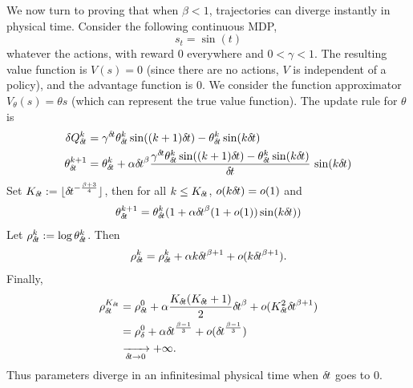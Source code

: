 We now turn to proving that when $\beta < 1$,
trajectories can diverge instantly in physical time. 
Consider the following continuous MDP, 
\begin{equation}
	s_t = \sin(t)
\end{equation}
whatever the actions,
with reward $0$ everywhere and $0 < \gamma < 1$.
The resulting value function is $V(s) = 0$ (since there
are no actions, $V$ is independent of a policy), and the advantage
function is $0$.
We consider the function approximator $V_\theta(s) = \theta s$ (which can
represent the true value function).
The update rule for $\theta$ is
\begin{align}
\delta Q_{\delta\hspace{-.1em}t}^k &= \gamma^{\delta\hspace{-.1em}t} \theta_{\delta\hspace{-.1em}t}^k \sin((k + 1)
{\delta\hspace{-.1em}t}) - \theta_{\delta\hspace{-.1em}t}^k \sin(k{\delta\hspace{-.1em}t})\\
	\theta_{\delta\hspace{-.1em}t}^{k+1} &= \theta_{\delta\hspace{-.1em}t}^k + \alpha {\delta\hspace{-.1em}t}^\beta
	\frac{\gamma^{\delta\hspace{-.1em}t} \theta_{\delta\hspace{-.1em}t}^k \sin((k + 1) {\delta\hspace{-.1em}t}) -
	\theta_{\delta\hspace{-.1em}t}^k \sin(k{\delta\hspace{-.1em}t})}{{\delta\hspace{-.1em}t}}\,\sin(k{\delta\hspace{-.1em}t})
\end{align}
Set $K_{\delta\hspace{-.1em}t} \mathrel{\mathop{:}}= \lfloor {\delta\hspace{-.1em}t}^{-\frac{\beta + 3}{4}}\rfloor$, then for all
$k \leq K_{\delta\hspace{-.1em}t}$, $o(k{\delta\hspace{-.1em}t}) = o(1)$ and
\begin{align}
	\theta_{\delta\hspace{-.1em}t}^{k+1} &= \theta_{\delta\hspace{-.1em}t}^k(1 + \alpha {\delta\hspace{-.1em}t}^\beta
	(1 + o(1))\sin(k{\delta\hspace{-.1em}t}))\\
\end{align}
Let $\rho_{\delta\hspace{-.1em}t}^k \mathrel{\mathop{:}}= \log \theta_{\delta\hspace{-.1em}t}^k$. Then
\begin{align}
	\rho_{\delta\hspace{-.1em}t}^k = \rho_{\delta\hspace{-.1em}t}^k + \alpha
	k{\delta\hspace{-.1em}t}^{\beta + 1} + o(k{\delta\hspace{-.1em}t}^{\beta + 1}).
\end{align}
Finally,
\begin{align}
	\rho_{\delta\hspace{-.1em}t}^{K_{\delta\hspace{-.1em}t}} &= \rho_{\delta\hspace{-.1em}t}^0 + \alpha \frac{K_{\delta\hspace{-.1em}t} (K_{\delta\hspace{-.1em}t} + 1)}{2}{\delta\hspace{-.1em}t}^\beta + o(K_{\delta\hspace{-.1em}t}^2{\delta\hspace{-.1em}t}^{\beta + 1})\\
				 &= \rho_\delta^0 + \alpha{\delta\hspace{-.1em}t}^\frac{\beta
					 - 1}{3} + o({\delta\hspace{-.1em}t}^\frac{\beta - 1}{3})\\
				 &\xrightarrow[{\delta\hspace{-.1em}t}\to 0]{} +\infty.
\end{align}
Thus parameters diverge in an infinitesimal physical time when ${\delta\hspace{-.1em}t}$ goes to $0$.

